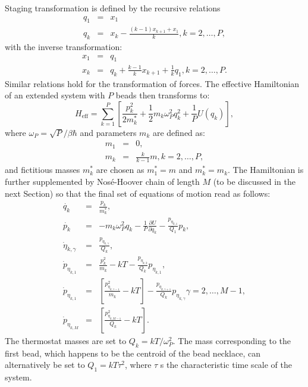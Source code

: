 Staging transformation is defined by the recursive relations 
\begin{eqnarray}
q_1&=&x_1 \nonumber \\
q_k&=&x_k - \frac{(k-1)x_{k+1}+x_1}{k},   k=2,\dots,P ,
\end{eqnarray}
with the inverse transformation:
\begin{eqnarray}
x_1&=&q_1 \nonumber \\
x_k&=&q_k+\frac{k-1}{k}x_{k+1}+\frac{1}{k}q_1,   k=2,\dots,P .
\end{eqnarray}
Similar relations hold for the transformation of forces.
The effective Hamiltonian of an extended system with $P$ beads  %
then transforms to: 
\begin{equation}
H_{\mathrm{eff}}= \sum^P_{k=1}\left[\frac{p_k^2}{2m^*_k} + \frac{1}{2}m_k\omega_P^2 q_k^2+\frac{1}{P}U(q_k)\right]  ,
\end{equation}
where $\omega_P=\sqrt{P}/\beta\hbar$ and parameters $m_k$ are defined as:
\begin{eqnarray}
m_1 &=& 0, \\
m_k &=& \frac{k}{k-1}m,   k=2,\dots ,P ,
\end{eqnarray}
and fictitious masses $m_k^*$ are chosen as $m^*_1=m$ and $m_k^*=m_k$. The Hamiltonian is further supplemented by Nosé-Hoover chain of length $M$ (to be discussed in the next Section) so that the final set of equations of motion read as follows:
\begin{subequations}
\label{eqPIMDfull}
\begin{eqnarray}
\dot{q_k}&=&\frac{p_k}{m_k^{*}}  ,\\
\dot{p_k}&=&-m_k\omega^2_P q_k - \frac{1}{P}\frac{\partial U}{\partial q_k} - \frac{p_{\eta_{k,1}}}{Q_1}p_k  , \\
\dot{\eta}_{k,\gamma}&=&\frac{p_{\eta_{k, \gamma}}}{Q_k}   ,\\
\label{eqNHC1}
\dot{p}_{\eta_{k,1}}&=&\frac{p_k^2}{m_k^{}}-kT-\frac{p_{\eta_{k,2}}}{Q_k}p_{\eta_{k,1}}   ,\\
\dot{p}_{\eta_{k,1}}&=&\left[\frac{p_{\eta_{k,\gamma-1}}^2}{m_k^{}}-kT\right]-\frac{p_{\eta_{k,\gamma+1}}}{Q_k}p_{\eta_{k,\gamma}}   \gamma = 2,\dots ,M-1   , \\
\dot{p}_{\eta_{k,M}}&=&\left[\frac{p_{\eta_{k,M-1}}^2}{Q_k}-kT\right]  .
\end{eqnarray}
\end{subequations}
The thermostat masses are set to $Q_k=kT/\omega^2_P$. The mass corresponding to the first bead, which happens to be the centroid of the bead necklace, can alternatively be set to $Q_1=kT\tau^2$, where $\tau$ s the characteristic time scale of the system.
  
